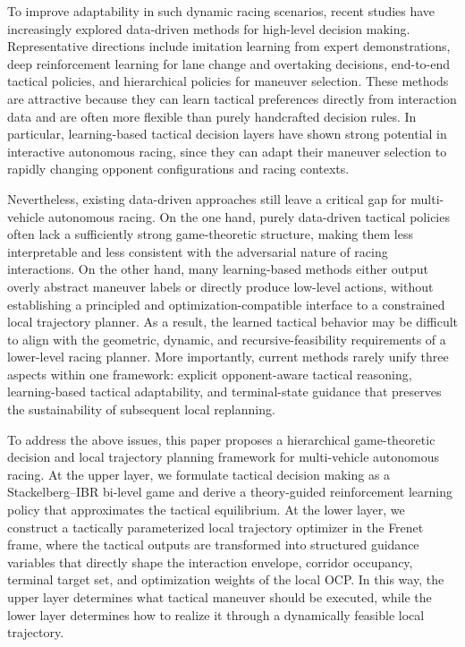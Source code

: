 \documentclass[final ,3p, times]{elsarticle}
\begin{document}
To improve adaptability in such dynamic racing scenarios, recent studies have increasingly explored data-driven methods for high-level decision making. Representative directions include imitation learning from expert demonstrations, deep reinforcement learning for lane change and overtaking decisions, end-to-end tactical policies, and hierarchical policies for maneuver selection. These methods are attractive because they can learn tactical preferences directly from interaction data and are often more flexible than purely handcrafted decision rules. In particular, learning-based tactical decision layers have shown strong potential in interactive autonomous racing, since they can adapt their maneuver selection to rapidly changing opponent configurations and racing contexts.  \cite{irshayyid2024rlreview,reiter2024hrlmpc,pathare2025truck}

Nevertheless, existing data-driven approaches still leave a critical gap for multi-vehicle autonomous racing. On the one hand, purely data-driven tactical policies often lack a sufficiently strong game-theoretic structure, making them less interpretable and less consistent with the adversarial nature of racing interactions. On the other hand, many learning-based methods either output overly abstract maneuver labels or directly produce low-level actions, without establishing a principled and optimization-compatible interface to a constrained local trajectory planner. As a result, the learned tactical behavior may be difficult to align with the geometric, dynamic, and recursive-feasibility requirements of a lower-level racing planner. More importantly, current methods rarely unify three aspects within one framework: explicit opponent-aware tactical reasoning, learning-based tactical adaptability, and terminal-state guidance that preserves the sustainability of subsequent local replanning. \cite{reiter2024hrlmpc,hu2025survey,irshayyid2024rlreview}

To address the above issues, this paper proposes a hierarchical game-theoretic decision and local trajectory planning framework for multi-vehicle autonomous racing. At the upper layer, we formulate tactical decision making as a Stackelberg--IBR bi-level game and derive a theory-guided reinforcement learning policy that approximates the tactical equilibrium. At the lower layer, we construct a tactically parameterized local trajectory optimizer in the Frenet frame, where the tactical outputs are transformed into structured guidance variables that directly shape the interaction envelope, corridor occupancy, terminal target set, and optimization weights of the local OCP. In this way, the upper layer determines what tactical maneuver should be executed, while the lower layer determines how to realize it through a dynamically feasible local trajectory.
\end{document}
